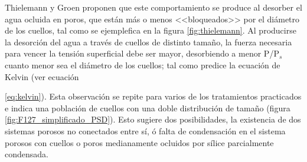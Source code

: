 			Thielemann \cite{Thielemann2011} y Groen\cite{Groen2003} proponen que este comportamiento se produce al desorber el agua ocluida en poros, que están más o menos <<bloqueados>> por el diámetro de los cuellos, tal como se ejemplefica en la figura \ref{fig:thielemann}. Al producirse la desorción del agua a través de cuellos de distinto tamaño, la fuerza  necesaria para vencer la tensión superficial debe ser mayor, desorbiendo a menor P/P$_s$ cuanto menor sea el diámetro de los cuellos; tal como predice la ecuación de Kelvin (ver ecuación {\ref{eq:kelvin}). Esta observación se repite para varios de los tratamientos practicados e indica una población de cuellos con una doble distribución de tamaño (figura \ref{fig:F127_simplificado_PSD}). Esto sugiere dos posibilidades, la existencia de dos sistemas porosos no conectados entre sí, ó falta de condensación en el sistema porosos con cuellos o poros medianamente ocluidos por sílice parcialmente condensada.

}
